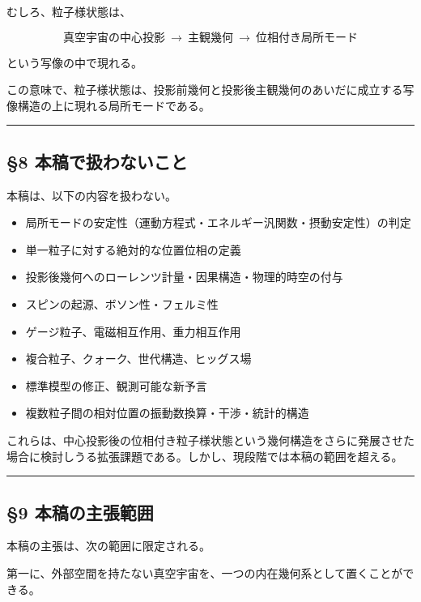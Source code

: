 \documentclass[
]{ltjsarticle}
\providecommand{\tightlist}{%
  \setlength{\itemsep}{0pt}\setlength{\parskip}{0pt}}
\begin{document}
むしろ、粒子様状態は、

\[\text{真空宇宙の中心投影}\ \rightarrow\ \text{主観幾何}\ \rightarrow\ \text{位相付き局所モード}\]

という写像の中で現れる。

この意味で、粒子様状態は、投影前幾何と投影後主観幾何のあいだに成立する写像構造の上に現れる局所モードである。

\begin{center}\rule{0.5\linewidth}{0.5pt}\end{center}

\subsection{§8
本稿で扱わないこと}\label{ux672cux7a3fux3067ux6271ux308fux306aux3044ux3053ux3068}

本稿は、以下の内容を扱わない。

\begin{itemize}
\tightlist
\item
  局所モードの安定性（運動方程式・エネルギー汎関数・摂動安定性）の判定
\item
  単一粒子に対する絶対的な位置位相の定義
\item
  投影後幾何へのローレンツ計量・因果構造・物理的時空の付与
\item
  スピンの起源、ボソン性・フェルミ性
\item
  ゲージ粒子、電磁相互作用、重力相互作用
\item
  複合粒子、クォーク、世代構造、ヒッグス場
\item
  標準模型の修正、観測可能な新予言
\item
  複数粒子間の相対位置の振動数換算・干渉・統計的構造
\end{itemize}

これらは、中心投影後の位相付き粒子様状態という幾何構造をさらに発展させた場合に検討しうる拡張課題である。しかし、現段階では本稿の範囲を超える。

\begin{center}\rule{0.5\linewidth}{0.5pt}\end{center}

\subsection{§9
本稿の主張範囲}\label{ux672cux7a3fux306eux4e3bux5f35ux7bc4ux56f2}

本稿の主張は、次の範囲に限定される。

第一に、外部空間を持たない真空宇宙を、一つの内在幾何系として置くことができる。
\end{document}
